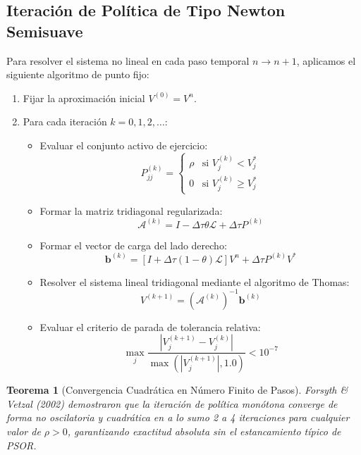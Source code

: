 \documentclass[11pt,a4paper]{article}
\newtheorem{theorem}{Teorema}[section]
\begin{document}
\subsection{Iteración de Política de Tipo Newton Semisuave}
Para resolver el sistema no lineal en cada paso temporal $n \to n+1$, aplicamos el siguiente algoritmo de punto fijo:
\begin{enumerate}
    \item Fijar la aproximación inicial $V^{(0)} = V^n$.
    \item Para cada iteración $k = 0, 1, 2, \dots$:
    \begin{itemize}
        \item Evaluar el conjunto activo de ejercicio:
        \begin{equation}
            P_{jj}^{(k)} = \begin{cases}
                \rho & \text{si } V_j^{(k)} < V_j^* \\
                0 & \text{si } V_j^{(k)} \ge V_j^*
            \end{cases}
        \end{equation}
        \item Formar la matriz tridiagonal regularizada:
        \begin{equation}
            \mathcal{A}^{(k)} = I - \Delta \tau \theta \mathcal{L} + \Delta \tau P^{(k)}
        \end{equation}
        \item Formar el vector de carga del lado derecho:
        \begin{equation}
            \mathbf{b}^{(k)} = \left[ I + \Delta \tau (1 - \theta) \mathcal{L} \right] V^n + \Delta \tau P^{(k)} V^*
        \end{equation}
        \item Resolver el sistema lineal tridiagonal mediante el algoritmo de Thomas:
        \begin{equation}
            V^{(k+1)} = (\mathcal{A}^{(k)})^{-1} \mathbf{b}^{(k)}
        \end{equation}
        \item Evaluar el criterio de parada de tolerancia relativa:
        \begin{equation}
            \max_{j} \frac{|V_j^{(k+1)} - V_j^{(k)}|}{\max(|V_j^{(k+1)}|, 1.0)} < 10^{-7}
        \end{equation}
    \end{itemize}
\end{enumerate}
\begin{theorem}[Convergencia Cuadrática en Número Finito de Pasos]
Forsyth \& Vetzal (2002) demostraron que la iteración de política monótona converge de forma no oscilatoria y cuadrática en a lo sumo 2 a 4 iteraciones para cualquier valor de $\rho > 0$, garantizando exactitud absoluta sin el estancamiento típico de PSOR.
\end{theorem}
\end{document}
